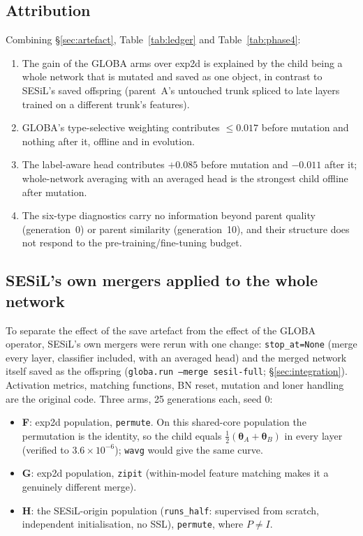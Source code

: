\documentclass[11pt,a4paper]{article}
\newcommand{\thetav}{\boldsymbol{\theta}}
\newcommand{\code}[1]{\texttt{#1}}
\begin{document}
\subsection{Attribution}
Combining \S\ref{sec:artefact}, Table~\ref{tab:ledger} and Table~\ref{tab:phase4}:
\begin{enumerate}[nosep]
\item The gain of the GLOBA arms over exp2d is explained by the child being a whole network that is mutated and saved as one object, in contrast to SESiL's saved offspring (parent~A's untouched trunk spliced to late layers trained on a different trunk's features).
\item GLOBA's type-selective weighting contributes $\le 0.017$ before mutation and nothing after it, offline and in evolution.
\item The label-aware head contributes $+0.085$ before mutation and $-0.011$ after it; whole-network averaging with an averaged head is the strongest child offline after mutation.
\item The six-type diagnostics carry no information beyond parent quality (generation~0) or parent similarity (generation~10), and their structure does not respond to the pre-training/fine-tuning budget.
\end{enumerate}

\subsection{SESiL's own mergers applied to the whole network}
\label{sec:wholenet}
To separate the effect of the save artefact from the effect of the GLOBA operator, SESiL's own mergers were rerun with one change: \code{stop\_at=None} (merge every layer, classifier included, with an averaged head) and the merged network itself saved as the offspring (\code{globa.run --merge sesil-full}; \S\ref{sec:integration}). Activation metrics, matching functions, BN reset, mutation and loner handling are the original code. Three arms, 25 generations each, seed 0:
\begin{itemize}[nosep]
\item \textbf{F}: exp2d population, \code{permute}. On this shared-core population the permutation is the identity, so the child equals $\tfrac12(\thetav_A+\thetav_B)$ in every layer (verified to $3.6\times10^{-6}$); \code{wavg} would give the same curve.
\item \textbf{G}: exp2d population, \code{zipit} (within-model feature matching makes it a genuinely different merge).
\item \textbf{H}: the SESiL-origin population (\code{runs\_half}: supervised from scratch, independent initialisation, no SSL), \code{permute}, where $P\neq I$.
\end{itemize}
\end{document}

